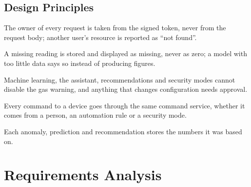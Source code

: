 \documentclass[12pt,a4paper,oneside]{report}
\begin{document}
\section{Design Principles}
\begin{description}[style=nextline,leftmargin=1.2em]
  \item[Ownership first.] The owner of every request is taken from the signed token, never from the request body; another user's resource is reported as ``not found''.
  \item[Never invent data.] A missing reading is stored and displayed as missing, never as zero; a model with too little data says so instead of producing figures.
  \item[Advisory intelligence.] Machine learning, the assistant, recommendations and security modes cannot disable the gas warning, and anything that changes configuration needs approval.
  \item[One path for actions.] Every command to a device goes through the same command service, whether it comes from a person, an automation rule or a security mode.
  \item[Explainability.] Each anomaly, prediction and recommendation stores the numbers it was based on.
\end{description}

\chapter{Requirements Analysis}
\label{ch:requirements}
\end{document}
